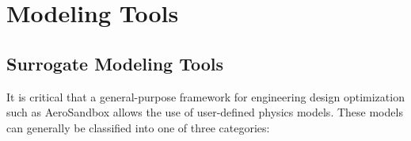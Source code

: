 \chapter{Modeling Tools}
\label{chapter:modeling}


%


\section{Surrogate Modeling Tools}
\label{sect:surrogate}

It is critical that a general-purpose framework for engineering design optimization such as AeroSandbox allows the use of user-defined physics models. These models can generally be classified into one of three categories:

